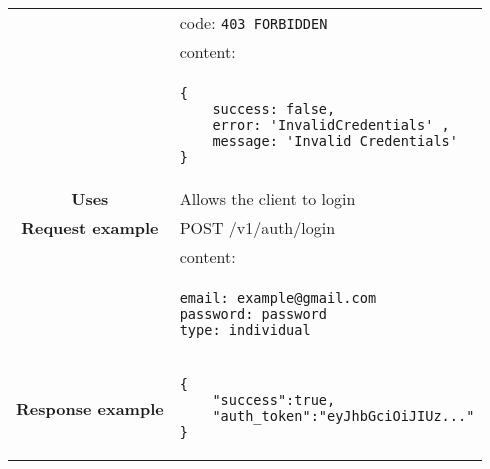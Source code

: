 \begin{adjustwidth}{1cm}{}
\begin{longtable}{|c|l|}
              & code: \texttt{403 FORBIDDEN} \\
            &                         content: \\
            & \begin{minipage}[t]{0.7\textwidth}
                \begin{adjustwidth}{1.5cm}{}
                \begin{verbatim}
{
    success: false, 
    error: 'InvalidCredentials' ,
    message: 'Invalid Credentials'
}
                \end{verbatim}
                \end{adjustwidth}
              \end{minipage} \\
              \hline
            \textbf{Uses} & Allows the client to login \\
            \hline
             \textbf{Request example}
             & POST /v1/auth/login \\
             & content: \\
            & \begin{minipage}[t]{0.5\textwidth}
                \begin{adjustwidth}{1.5cm}{}
                \begin{verbatim}
email: example@gmail.com
password: password
type: individual
                \end{verbatim}
                \end{adjustwidth}
              \end{minipage} \\
              \hline
             \textbf{Response example} & 
              \begin{minipage}[t]{0.5\textwidth}
                \begin{adjustwidth}{1.5cm}{}
                \begin{verbatim}
{
    "success":true,
    "auth_token":"eyJhbGciOiJIUz..."
}
                \end{verbatim}
                \end{adjustwidth}
              \end{minipage} \\
              \hline
        \end{longtable}
    \end{adjustwidth}
    
